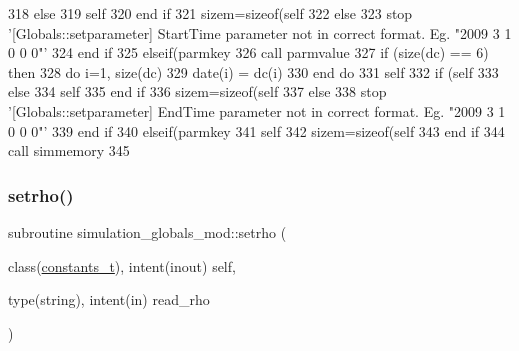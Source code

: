 \begin{DoxyCode}
318             \textcolor{keywordflow}{else}
319                 self%
320 \textcolor{keywordflow}{            end if}
321             sizem=sizeof(self%
322         \textcolor{keywordflow}{else}
323             stop \textcolor{stringliteral}{'[Globals::setparameter] StartTime parameter not in correct format. Eg. "2009 3 1 0 0 0"'}
324 \textcolor{keywordflow}{        end if}
325     \textcolor{keywordflow}{elseif}(parmkey%
326         \textcolor{keyword}{call }parmvalue%
327         \textcolor{keywordflow}{if} (\textcolor{keyword}{size}(dc) == 6) \textcolor{keywordflow}{then}
328             \textcolor{keywordflow}{do} i=1, \textcolor{keyword}{size}(dc)
329                 date(i) = dc(i)%
330 \textcolor{keywordflow}{            end do}
331             self%
332             \textcolor{keywordflow}{if} (self%
333             \textcolor{keywordflow}{else}
334                 self%
335 \textcolor{keywordflow}{            end if}
336             sizem=sizeof(self%
337         \textcolor{keywordflow}{else}
338             stop \textcolor{stringliteral}{'[Globals::setparameter] EndTime parameter not in correct format. Eg. "2009 3 1 0 0 0"'}
339 \textcolor{keywordflow}{        end if}
340     \textcolor{keywordflow}{elseif}(parmkey%
341         self%
342         sizem=sizeof(self%
343 \textcolor{keywordflow}{    end if}
344     \textcolor{keyword}{call }simmemory%
345 
\end{DoxyCode}
\mbox{\label{namespacesimulation__globals__mod_a68a87c39cf88bad353e28e367a721ed4}} 
\subsubsection{\texorpdfstring{setrho()}{setrho()}}
{\footnotesize\ttfamily subroutine simulation\+\_\+globals\+\_\+mod\+::setrho (\begin{DoxyParamCaption}\item[{class(\mbox{\hyperlink{structsimulation__globals__mod_1_1constants__t}{constants\+\_\+t}}), intent(inout)}]{self,  }\item[{type(string), intent(in)}]{read\+\_\+rho }\end{DoxyParamCaption})\hspace{0.3cm}{\ttfamily [private]}}



